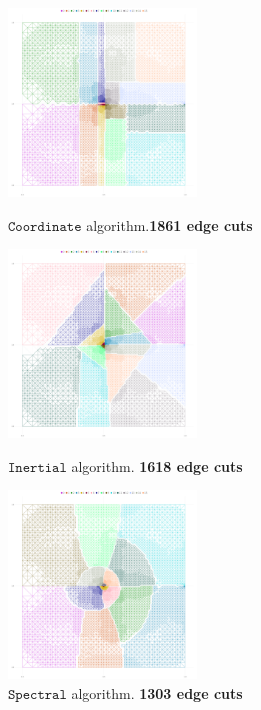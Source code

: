 \documentclass[unicode,11pt,a4paper,oneside,numbers=endperiod,openany]{scrartcl}
\begin{document}
\begin{figure}[h!]
    \begin{minipage}{0.5\textwidth}
        \centering
        \includegraphics[height=5cm]{fig/plot/recursive/recursive-crack-coordinate-p16-cut_1861.0}
        \caption{$\texttt {Coordinate}$ algorithm.\textbf{1861 edge cuts}}
    \end{minipage}
    \begin{minipage}{0.5\textwidth}
        \centering
        \includegraphics[height=5cm]{fig/plot/recursive/recursive-crack-inertial-p16-cut_1618.0}
        \caption{$\texttt {Inertial}$ algorithm. \textbf{1618 edge cuts}}
    \end{minipage}
        \begin{minipage}{0.5\textwidth}
        \centering
        \includegraphics[height=5cm]{fig/plot/recursive/recursive-crack-spectral-p16-cut_1303.0}
        \caption{$\texttt {Spectral}$ algorithm. \textbf{1303 edge cuts}}
    \end{minipage}
    \begin{minipage}{0.5\textwidth}

\end{minipage}
\end{figure}
\end{document}
